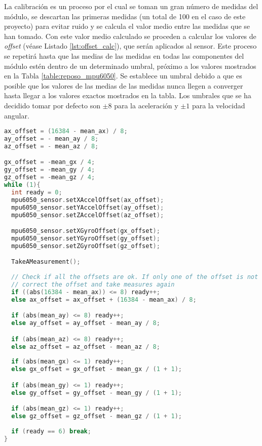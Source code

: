 La calibración es un proceso por el cual se toman un gran número de medidas del módulo, se descartan las primeras medidas (un total de 100 en el caso de este proyecto) para evitar ruido y se calcula el valor medio entre las medidas que se han tomado. Con este valor medio calculado se proceden a calcular los valores de \textit{offset} (véase Listado \ref{lst:offset_calc}), que serán aplicados al sensor. Este proceso se repetirá hasta que las medias de las medidas en todas las componentes del módulo estén dentro de un determinado umbral, próximo a los valores mostrados en la Tabla \ref{table:reposo_mpu6050}. Se establece un umbral debido a que es posible que los valores de las medias de las medidas nunca llegen a converger hasta llegar a los valores exactos mostrados en la tabla. Los umbrales que se ha decidido tomar por defecto son $\pm 8$ para la aceleración y $\pm 1$ para la velocidad angular.

\begin{lstlisting}[language=c++,captionpos=t,caption={\textbf{Cálculo de los \textit{offsets} (en este ejemplo se han sustituido las constantes por números para un mejor entendimiento).}},label={lst:offset_calc}]
ax_offset = (16384 - mean_ax) / 8;
ay_offset = - mean_ay / 8;
az_offset = - mean_az / 8;

gx_offset = -mean_gx / 4;
gy_offset = -mean_gy / 4;
gz_offset = -mean_gz / 4;
while (1){
  int ready = 0;
  mpu6050_sensor.setXAccelOffset(ax_offset);
  mpu6050_sensor.setYAccelOffset(ay_offset);
  mpu6050_sensor.setZAccelOffset(az_offset);

  mpu6050_sensor.setXGyroOffset(gx_offset);
  mpu6050_sensor.setYGyroOffset(gy_offset);
  mpu6050_sensor.setZGyroOffset(gz_offset);

  TakeAMeasurement();
    
  // Check if all the offsets are ok. If only one of the offset is not ok,
  // correct the offset and take measures again
  if ((abs(16384 - mean_ax)) <= 8) ready++;
  else ax_offset = ax_offset + (16384 - mean_ax) / 8;

  if (abs(mean_ay) <= 8) ready++;
  else ay_offset = ay_offset - mean_ay / 8;

  if (abs(mean_az) <= 8) ready++;
  else az_offset = az_offset - mean_az / 8;
	
  if (abs(mean_gx) <= 1) ready++;
  else gx_offset = gx_offset - mean_gx / (1 + 1);

  if (abs(mean_gy) <= 1) ready++;
  else gy_offset = gy_offset - mean_gy / (1 + 1);

  if (abs(mean_gz) <= 1) ready++;
  else gz_offset = gz_offset - mean_gz / (1 + 1);
  
  if (ready == 6) break;
}
\end{lstlisting}

